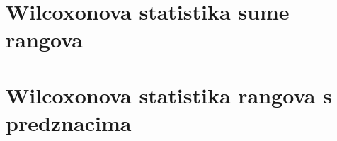 \documentclass[ a4paper, 12pt]{report}
\numberwithin{Primjer}{chapter}
\begin{document}
%


%
%
\newpage
{} \setcounter{page}{1}
\tableofcontents
%
%

%
 \setcounter{page}{1}
%
\chapter{Wilcoxonova statistika sume rangova}
%


%
%
\chapter{Wilcoxonova statistika rangova s predznacima}
%

%
%
\end{document}
